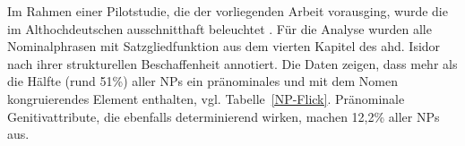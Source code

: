 
Im Rahmen einer Pilotstudie, die der vorliegenden Arbeit vorausging, wurde die  im Althochdeutschen ausschnitthaft beleuchtet \parencite{Flick2018}. Für die Analyse wurden alle Nominalphrasen  mit Satzgliedfunktion aus dem vierten Kapitel des ahd. Isidor nach ihrer strukturellen Beschaffenheit annotiert.  Die Daten zeigen, dass mehr als die Hälfte (rund 51\%) aller NPs  ein pränominales und mit dem Nomen kongruierendes Element enthalten, vgl. Tabelle~\ref{NP-Flick}. Pränominale Genitivattribute,  die ebenfalls determinierend wirken, machen 12,2\% aller NPs  aus. 


